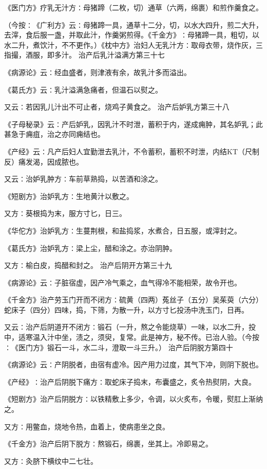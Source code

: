 \documentclass[a4paper,12pt,UTF8,twoside]{ctexbook}
\begin{document}
《医门方》疗乳无汁方∶母猪蹄（二枚，切）通草（六两，绵裹）和煎作羹食之。

（今按∶《广利方》云∶母猪蹄一具，通草十二分，切，以水大四升，煎二大升，去滓，食后服一盏，并取此汁，作羹粥煎得。《千金方》∶母猪蹄一具，粗切，以水二升，煮饮汁，不不更作。）《枕中方》治妇人无乳汁方∶取母衣带，烧作灰，三指撮，酒服，即多汁。
治产后乳汁溢满方第三十七

《病源论》云∶经血盛者，则津液有余，故乳汁多而溢出。

《葛氏方》云∶乳汁溢满急痛者，但温石以熨之。

又云∶若因乳儿汁出不可止者，烧鸡子黄食之。
治产后妒乳方第三十八

《子母秘录》云∶产后妒乳，因乳汁不时泄，蓄积于内，遂成痈肿，其名妒乳；此甚急于痈疽，治之亦同痈结也。

《产经》云∶凡产后妇人宜勤泄去乳汁，不令蓄积，蓄积不时泄，内结KT（尺制反）痛发渴，因成脓也。

又云∶治妒乳肿方∶车前草熟捣，以苦酒和涂之。

《短剧方》治妒乳方∶生地黄汁以敷之。

又方∶葵根捣为末，服方寸匕，日三。

《华佗方》治妒乳方∶生蔓荆根，和盐捣浆，水煮合，日五服，或滓封之。

《葛氏方》治妒乳方∶梁上尘，醋和涂之。亦治阴肿。

又方∶榆白皮，捣醋和封之。
治产后阴开方第三十九

《病源论》云∶子脏宿虚，因产冷气乘之，血气得冷不能相荣，故令开也。

《千金方》治产劳玉门开而不闭方∶硫黄（四两）菟丝子（五分）吴茱萸（六分）蛇床子（四分）四味，捣，下筛，为散一升，以方寸匕投汤中洗玉门，日再。

又云∶治产后阴道开不闭方∶锻石（一升，熬之令能烧草）一味，以水二升，投中，适寒温入汁中坐，渍之，须臾，复常。此是神方，秘不传。已治人验。（今按∶《医门方》锻石一斗，水二斗，澄取一斗三升。）
治产后阴脱方第四十

《病源论》云∶产阴脱者，由宿有虚冷。因产用力过度，其气下冲，则阴下脱也。

《产经》∶治产后阴脱下痛方∶取蛇床子捣末，布囊盛之，炙令热熨阴，大良。

《短剧方》治产后阴脱方∶以铁精敷上多少，令调，以火炙布，令暖，熨肛上渐纳之。

又方∶用鳖血，烧地令热，血着上，使病患坐之良。

《千金方》治产后阴下脱方∶熬锻石，绵裹，坐其上。冷即易之。

又方∶灸脐下横纹中二七壮。
\end{document}
